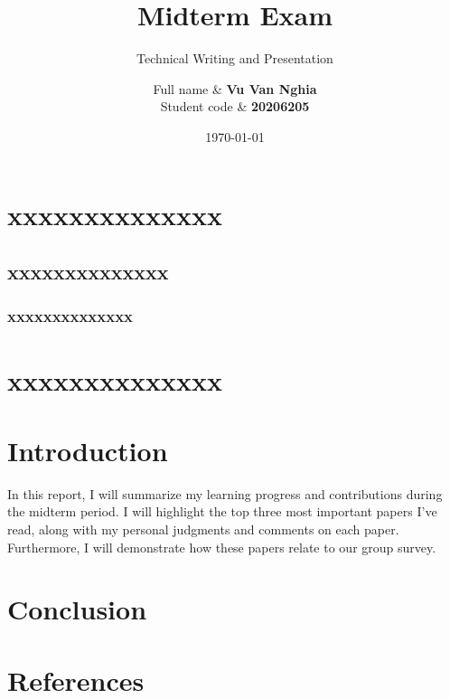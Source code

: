 \documentclass[12pt, twoside]{article}
\title{Midterm Exam}
\subtitle{Technical Writing and Presentation}
\author{
    Full name & \textbf{Vu Van Nghia} \\
    Student code &   \textbf{20206205} \\[1cm]
}
\date{\today}
\begin{document}
\maketitlepage
\newpage
\section{xxxxxxxxxxxxxx}
\subsection{xxxxxxxxxxxxxx}
\subsubsection{xxxxxxxxxxxxxx}
\section{xxxxxxxxxxxxxx}


\section{Introduction}

In this report, I will summarize my learning progress and contributions during the midterm period. I will highlight the top three most important papers I've read, along with my personal judgments and comments on each paper. Furthermore, I will demonstrate how these papers relate to our group survey.




\section{Conclusion}



\section{References}


\end{document}
